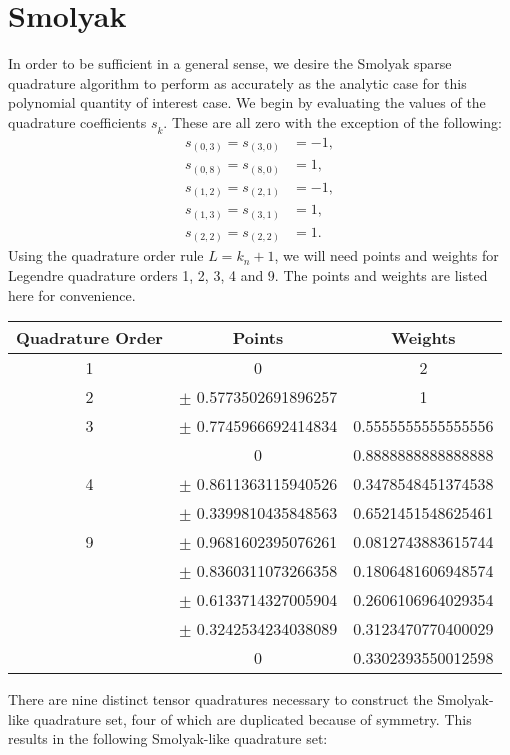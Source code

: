 \documentclass[11pt]{article}
\begin{document}
\section{Smolyak}
In order to be sufficient in a general sense, we desire the Smolyak sparse quadrature algorithm to perform
as accurately as the analytic case for this polynomial quantity of interest case.  We begin by evaluating the
values of the quadrature coefficients $s_{\hat k}$.  These are all zero with the exception of the following:
\begin{align}
  s_{(0,3)} = s_{(3,0)} &= -1, \\
  s_{(0,8)} = s_{(8,0)} &=  1, \\
  s_{(1,2)} = s_{(2,1)} &= -1, \\
  s_{(1,3)} = s_{(3,1)} &=  1, \\
  s_{(2,2)} = s_{(2,2)} &=  1.
\end{align}
Using the quadrature order rule $L=k_n+1$, we will need points and weights for Legendre quadrature orders 1,
2, 3, 4 and 9.  The points and weights are listed here for convenience.
\begin{table}[H]
  \centering
  \begin{tabular}{c c c}
    Quadrature Order & Points & Weights \\ \hline
    1 & 0 & 2 \\ \hline
    2 & $\pm$ 0.5773502691896257 & 1\\ \hline
    3 & $\pm$ 0.7745966692414834 & 0.5555555555555556 \\
      & 0                        & 0.8888888888888888 \\ \hline
    4 & $\pm$ 0.8611363115940526 & 0.3478548451374538 \\
      & $\pm$ 0.3399810435848563 & 0.6521451548625461 \\ \hline
    9 & $\pm$ 0.9681602395076261 & 0.0812743883615744 \\
      & $\pm$ 0.8360311073266358 & 0.1806481606948574 \\
      & $\pm$ 0.6133714327005904 & 0.2606106964029354 \\
      & $\pm$ 0.3242534234038089 & 0.3123470770400029 \\
      & 0                        & 0.3302393550012598
  \end{tabular}
\end{table}
There are nine distinct tensor quadratures necessary to construct the Smolyak-like quadrature set, four of
which are duplicated because of symmetry.  This results in the following Smolyak-like quadrature set:
\end{document}
